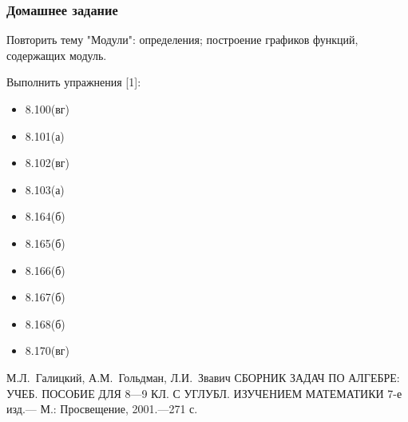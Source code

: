 \documentclass[algebra,a5paper]{pum}
\date{19.05.20}
\begin{document}
\subsubsection*{Домашнее задание}

Повторить тему "Модули": определения; построение графиков функций, содержащих модуль.

Выполнить упражнения [1]:

  \begin{itemize}
  \color{darkcolortheme}
    \item 8.100(вг)
    \item 8.101(а)
    \item 8.102(вг)
    \item 8.103(а)
    \item 8.164(б)
    \item 8.165(б) 
    \item 8.166(б)
    \item 8.167(б)
    \item 8.168(б)
    \item 8.170(вг)
  \end{itemize}

  \bigskip
[1] М.Л.~Галицкий, А.М.~Гольдман, Л.И.~Звавич СБОРНИК ЗАДАЧ ПО АЛГЕБРЕ:
УЧЕБ. ПОСОБИЕ ДЛЯ 8—9 КЛ. С УГЛУБЛ. ИЗУЧЕНИЕМ МАТЕМАТИКИ 7-е изд.— М.: Просвещение, 2001.—271 с.
\end{document}
